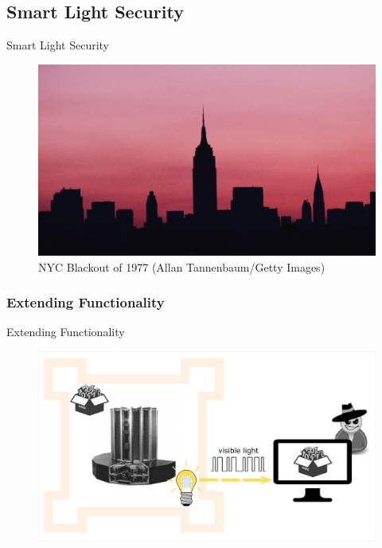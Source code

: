 \documentclass[11pt,t,usepdftitle=false,aspectratio=169]{beamer}
\begin{document}
\subsection{Smart Light Security} %
\label{sub:smart_light_security}
\begin{frame}{Smart Light Security} %
	\begin{figure} %
		\centering
		\includegraphics{img/nyc-blackout.jpg}
		\caption{\small{NYC Blackout of 1977 (Allan Tannenbaum/Getty Images)}}
	\end{figure}
\end{frame}

\subsubsection{Extending Functionality} %
\label{subsub:extending}
\begin{frame}{Extending Functionality} %
	\begin{figure}
		\centering
		\includegraphics{img/extended-func-attack-light.png}
	\end{figure}
\end{frame}
\end{document}
